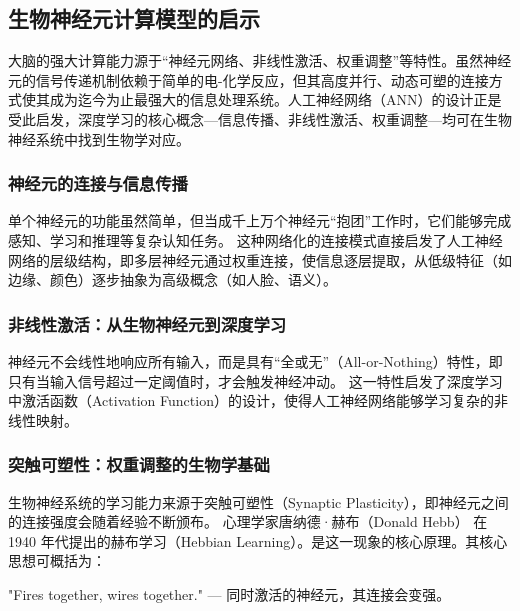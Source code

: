 \subsection{生物神经元计算模型的启示}
大脑的强大计算能力源于“神经元网络、非线性激活、权重调整”等特性。虽然神经元的信号传递机制依赖于简单的电-化学反应，但其高度并行、动态可塑的连接方式使其成为迄今为止最强大的信息处理系统。人工神经网络（ANN）的设计正是受此启发，深度学习的核心概念---信息传播、非线性激活、权重调整---均可在生物神经系统中找到生物学对应。

\subsubsection*{神经元的连接与信息传播}
单个神经元的功能虽然简单，但当成千上万个神经元“抱团”工作时，它们能够完成感知、学习和推理等复杂认知任务。 
这种网络化的连接模式直接启发了人工神经网络的层级结构，即多层神经元通过权重连接，使信息逐层提取，从低级特征（如边缘、颜色）逐步抽象为高级概念（如人脸、语义）。

\subsubsection*{非线性激活：从生物神经元到深度学习}

神经元不会线性地响应所有输入，而是具有“全或无”（All-or-Nothing）特性，即只有当输入信号超过一定阈值时，才会触发神经冲动。
这一特性启发了深度学习中激活函数（Activation Function）的设计，使得人工神经网络能够学习复杂的非线性映射。

\subsubsection*{突触可塑性：权重调整的生物学基础}

生物神经系统的学习能力来源于突触可塑性（Synaptic Plasticity），即神经元之间的连接强度会随着经验不断颁布。
心理学家唐纳德·赫布（Donald Hebb） 在 1940 年代提出的赫布学习（Hebbian Learning）。是这一现象的核心原理。其核心思想可概括为：

"Fires together, wires together." --- 同时激活的神经元，其连接会变强。

